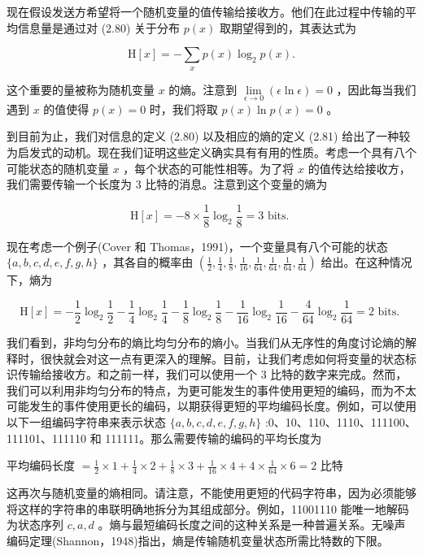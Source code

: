 \documentclass[10pt]{report}
\begin{document}
现在假设发送方希望将一个随机变量的值传输给接收方。他们在此过程中传输的平均信息量是通过对 (2.80) 关于分布 \(p\left( x\right)\) 取期望得到的，其表达式为

\[
\mathrm{H}\left\lbrack  x\right\rbrack   =  - \mathop{\sum }\limits_{x}p\left( x\right) {\log }_{2}p\left( x\right) . \tag{2.81}
\]

这个重要的量被称为随机变量 \(x\) 的熵。注意到 \(\mathop{\lim }\limits_{{\epsilon  \rightarrow  0}}\left( {\epsilon \ln \epsilon }\right)  = 0\) ，因此每当我们遇到 \(x\) 的值使得 \(p\left( x\right)  = 0\) 时，我们将取 \(p\left( x\right) \ln p\left( x\right)  = 0\) 。

到目前为止，我们对信息的定义 (2.80) 以及相应的熵的定义 (2.81) 给出了一种较为启发式的动机。现在我们证明这些定义确实具有有用的性质。考虑一个具有八个可能状态的随机变量 \(x\) ，每个状态的可能性相等。为了将 \(x\) 的值传达给接收方，我们需要传输一个长度为 3 比特的消息。注意到这个变量的熵为

\[
\mathrm{H}\left\lbrack  x\right\rbrack   =  - 8 \times  \frac{1}{8}{\log }_{2}\frac{1}{8} = 3\text{ bits. }
\]

现在考虑一个例子(Cover 和 Thomas，1991)，一个变量具有八个可能的状态 \(\{ a,b,c,d,e,f,g,h\}\) ，其各自的概率由 \(\left( {\frac{1}{2},\frac{1}{4},\frac{1}{8},\frac{1}{16},\frac{1}{64},\frac{1}{64},\frac{1}{64},\frac{1}{64}}\right)\) 给出。在这种情况下，熵为

\[
\mathrm{H}\left\lbrack  x\right\rbrack   =  - \frac{1}{2}{\log }_{2}\frac{1}{2} - \frac{1}{4}{\log }_{2}\frac{1}{4} - \frac{1}{8}{\log }_{2}\frac{1}{8} - \frac{1}{16}{\log }_{2}\frac{1}{16} - \frac{4}{64}{\log }_{2}\frac{1}{64} = 2\text{ bits. }
\]

我们看到，非均匀分布的熵比均匀分布的熵小。当我们从无序性的角度讨论熵的解释时，很快就会对这一点有更深入的理解。目前，让我们考虑如何将变量的状态标识传输给接收方。和之前一样，我们可以使用一个 3 比特的数字来完成。然而，我们可以利用非均匀分布的特点，为更可能发生的事件使用更短的编码，而为不太可能发生的事件使用更长的编码，以期获得更短的平均编码长度。例如，可以使用以下一组编码字符串来表示状态 \(\{ a,b,c,d,e,f,g,h\}\) :0、10、110、1110、111100、111101、111110 和 111111。那么需要传输的编码的平均长度为

平均编码长度 \(= \frac{1}{2} \times  1 + \frac{1}{4} \times  2 + \frac{1}{8} \times  3 + \frac{1}{16} \times  4 + 4 \times  \frac{1}{64} \times  6 = 2\) 比特

这再次与随机变量的熵相同。请注意，不能使用更短的代码字符串，因为必须能够将这样的字符串的串联明确地拆分为其组成部分。例如，11001110 能唯一地解码为状态序列 \(c,a,d\) 。熵与最短编码长度之间的这种关系是一种普遍关系。无噪声编码定理(Shannon，1948)指出，熵是传输随机变量状态所需比特数的下限。
\end{document}
